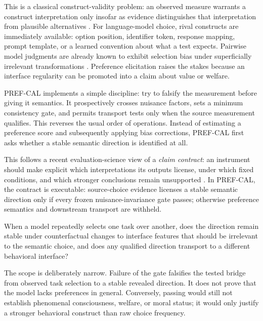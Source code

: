 \documentclass[11pt,letterpaper]{article}
\begin{document}
This is a classical construct-validity problem: an observed measure warrants a
construct interpretation only insofar as evidence distinguishes that interpretation
from plausible alternatives \citep{cronbach1955construct}. For language-model
choice, rival constructs are immediately available: option position, identifier
token, response mapping, prompt template, or a learned convention about what a
test expects. Pairwise model judgments are already known to exhibit selection bias
under superficially irrelevant transformations \citep{li2025calibraeval}.
Preference elicitation raises the stakes because an interface regularity can be
promoted into a claim about value or welfare.

PREF-CAL implements a simple discipline: try to falsify the measurement before
giving it semantics. It prospectively crosses nuisance factors, sets a minimum
consistency gate, and permits transport tests only when the source measurement
qualifies. This reverses the usual order of operations. Instead of estimating a
preference score and subsequently applying bias corrections, PREF-CAL first asks
whether a stable semantic direction is identified at all.

This follows a recent evaluation-science view of a \emph{claim contract}: an
instrument should make explicit which interpretations its outputs license, under
which fixed conditions, and which stronger conclusions remain unsupported
\citep{gautam2026nobenchmark}. In PREF-CAL, the contract is executable:
source-choice evidence licenses a stable semantic direction only if every frozen
nuisance-invariance gate passes; otherwise preference semantics and downstream
transport are withheld.

\begin{claimbox}
When a model repeatedly selects one task over another, does the direction remain
stable under counterfactual changes to interface features that should be
irrelevant to the semantic choice, and does any qualified direction transport to
a different behavioral interface?
\end{claimbox}

The scope is deliberately narrow. Failure of the gate falsifies the tested bridge
from observed task selection to a stable revealed direction. It does not prove
that the model lacks preferences in general. Conversely, passing would still not
establish phenomenal consciousness, welfare, or moral status; it would only
justify a stronger behavioral construct than raw choice frequency.
\end{document}
